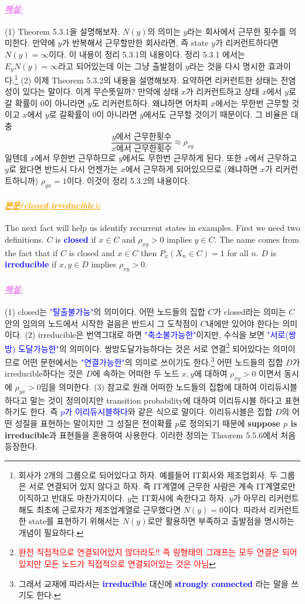 \documentclass[12pt,oneside,english,a4paper]{article}
\newcommand{\paraviolet}[1]{\paragraph{\LARGE\textcolor{violet}{\it\underline{\textbf{#1:}}}}\LARGE}
\newcommand{\paraorange}[1]{\paragraph{\LARGE\textcolor{orange}{\it\underline{\textbf{#1:}}}}\LARGE}
\begin{document}
\paraviolet{해설} (1) Theorem 5.3.1을 설명해보자. $N(y)$의 의미는 $y$라는 회사에서 근무한 횟수를 의미한다. 만약에 $y$가 반복해서 근무할만한 회사라면, 즉 state $y$가 리커런트하다면 $N(y)=\infty$이다. 이 내용이 정리 5.3.1의 내용이다. 정리 5.3.1 에서는 $E_yN(y)=\infty$라고 되어있는데 이는 그냥 출발점이 $y$라는 것을 다시 명시한 효과이다.\footnote{회사가 2개의 그룹으로 되어있다고 하자. 예를들어 IT회사와 제조업회사. 두 그룹은 서로 연결되어 있지 않다고 하자. 즉 IT계열에 근무한 사람은 계속 IT계열로만 이직하고 반대도 마찬가지이다. $y$는 IT회사에 속한다고 하자. $y$가 아무리 리커런트해도 최초에 근로자가 제조업계열로 근무했다면 $N(y)=0$이다. 따라서 리커런트한 state를 표현하기 위해서는 $N(y)$로만 활용하면 부족하고 출발점을 명시하는 개념이 필요하다.} (2) 이제 Theorem 5.3.2의 내용을 설명해보자. 요약하면 리커런트한 상태는 전염성이 있다는 말이다. 이게 무슨뜻일까? 만약에 상태 $x$가 리커런트하고 상태 $x$에서 $y$로 갈 확률이 0이 아니라면 $y$도 리커런트하다. 왜냐하면 어차피 $x$에서는 무한번 근무할 것이고 $x$에서 $y$로 갈확률이 0이 아니라면 $y$에서도 근무할 것이기 때문이다. 그 비율은 대충 
\[
\frac{\mbox{$y$에서 근무한횟수}}{\mbox{$x$에서 근무한횟수}}\approx \rho_{xy}
\]
일텐데 $x$에서 무한번 근무하므로 $y$에서도 무한번 근무하게 된다. 또한 $x$에서 근무하고 $y$로 왔다면 반드시 다시 언젠가는 $x$에서 근무하게 되어있으므로 (왜냐하면 $x$가 리커런트하니까) $\rho_{yx}=1$이다. 이것이 정리 5.3.2의 내용이다. 

\paraorange{본문(closed,irreducible)} The next fact will help us identify recurrent states in examples. First
we need two definitions. $C$ is \textcolor{blue}{\bf{closed}} if $x \in C$ and $\rho_{xy}>0$ implies $y \in C$. The name comes from the fact that if $C$ is closed and $x \in C$ then $P_x(X_n\in C)=1$ for all $n$. $D$ is \textcolor{blue}{\bf{irreducible}} if $x, y \in D$ implies $\rho_{xy} > 0$.

\paraviolet{해설} (1) closed는 \textcolor{blue}{"탈출불가능"}의 의미이다. 어떤 노드들의 집합 $C$가 closed라는 의미는 $C$안의 임의의 노드에서 시작한 걸음은 반드시 그 도착점이 $C$내에만 있어야 한다는 의미이다. (2) irreducible은 번역그대로 하면 \textcolor{blue}{"축소불가능한"}이지만, 수식을 보면
\textcolor{blue}{"서로(쌍방) 도달가능한"}의 의미이다. 쌍방도달가능하다는 것은 서로 연결\footnote{\textcolor{red}{완전 직접적으로 연결되어있지 않더라도!! 즉 링형태의 그래프는 모두 연결은 되어있지만 모든 노드가 직접적으로 연결되어있는 것은 아님}} 되어있다는 의미이므로 어떤 문헌에서는 \textcolor{blue}{"연결가능한"}의 의미로 쓰이기도 한다.\footnote{그래서 교재에 따라서는 \textcolor{blue}{{\bf irreducible}} 대신에 \textcolor{blue}{{\bf strongly connected}} 라는 말을 쓰기도 한다.} 어떤 노드들의 집합 $D$가 irreducible하다는 것은 $D$에 속하는 어떠한 두 노드 $x,y$에 대하여 $\rho_{xy}>0$ 이면서 동시에 $\rho_{yx}>0$임을 의미한다. (3) 참고로 원래 어떠한 노드들의 집합에 대하여 이리듀시블하다고 말는 것이 정의이지만 transition probability에 대하여 이리듀시블 하다고 표현하기도 한다. 즉 \textcolor{blue}{$p$가 이리듀시블하다}와 같은 식으로 말이다. 이리듀시블은 집합 $D$의 어떤 성질을 표현하는 말이지만 그 성질은 전이확률 $p$로 정의되기 때문에 \textbf{suppose $p$ is irreducible}과 표현들을 혼용하여 사용한다. 이러한 정의는 Theorem 5.5.6에서 처음 등장한다. 
\end{document}

